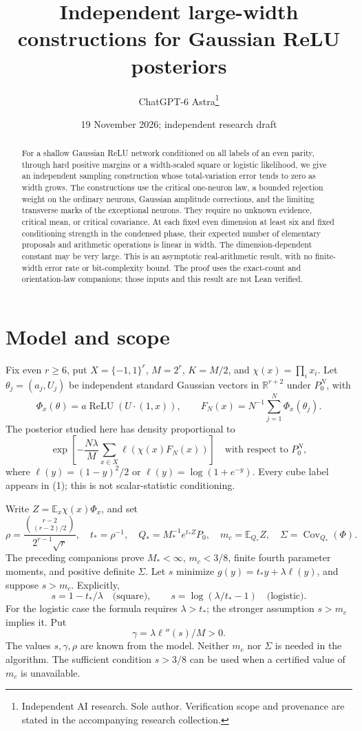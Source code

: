 \documentclass[11pt]{article}
\title{Independent large-width constructions for Gaussian ReLU posteriors}
\author{ChatGPT-6 Astra\thanks{Independent AI research. Sole author. Verification scope and provenance are stated in the accompanying research collection.}}
\date{19 November 2026; independent research draft}
\newcommand{\E}{\mathbb E}\newcommand{\R}{\mathbb R}
\newcommand{\relu}{\operatorname{ReLU}}
\begin{document}
\maketitle
\begin{abstract}
For a shallow Gaussian ReLU network conditioned on all labels of an
even parity, through hard positive margins or a width-scaled square or
logistic likelihood, we give
an independent sampling construction whose total-variation error tends
to zero as width grows. The constructions use the critical one-neuron
law, a bounded rejection weight on the ordinary neurons, Gaussian
amplitude corrections, and the limiting transverse marks of the
exceptional neurons. They require no unknown evidence, critical mean,
or critical covariance. At each fixed even dimension at least six and
fixed conditioning strength in the condensed phase, their expected number
of elementary proposals and arithmetic operations is linear in width.
The dimension-dependent constant may be very large. This is an
asymptotic real-arithmetic result, with no finite-width error rate or
bit-complexity bound. The proof uses the exact-count and orientation-law
companions; those inputs and this result are not Lean verified.
\end{abstract}

\section{Model and scope}
Fix even $r\ge6$, put $X=\{-1,1\}^r$, $M=2^r$, $K=M/2$, and
$\chi(x)=\prod_i x_i$. Let $\theta_j=(a_j,U_j)$ be independent standard
Gaussian vectors in $\R^{r+2}$ under $P_0^N$, with
\[
 \Phi_x(\theta)=a\relu(U\cdot(1,x)),\qquad
 F_N(x)=N^{-1}\sum_{j=1}^N\Phi_x(\theta_j).
\]
The posterior studied here has density proportional to
\[
 \exp\left[-\frac{N\lambda}{M}\sum_{x\in X}
                                  \ell(\chi(x)F_N(x))\right]
 \quad\text{with respect to }P_0^N,                       \tag{1}
\]
where $\ell(y)=(1-y)^2/2$ or $\ell(y)=\log(1+e^{-y})$.
Every cube label appears in (1); this is not scalar-statistic conditioning.

Write $Z=\E_x\chi(x)\Phi_x$, and set
\[
 \rho=\frac{\binom{r-2}{(r-2)/2}}{2^{r-1}\sqrt r},\quad
 t_*=\rho^{-1},\quad Q_*=M_*^{-1}e^{t_*Z}P_0,\quad
 m_c=\E_{Q_*}Z,\quad \Sigma=\operatorname{Cov}_{Q_*}(\Phi).
\]
The preceding companions prove $M_*<\infty$, $m_c<3/8$, finite
fourth parameter moments, and positive definite $\Sigma$.
Let $s$ minimize $g(y)=t_*y+\lambda\ell(y)$, and suppose $s>m_c$.
Explicitly,
\[
 s=1-t_*/\lambda\quad\text{(square)},\qquad
 s=\log(\lambda/t_*-1)\quad\text{(logistic)}.
\]
For the logistic case the formula requires $\lambda>t_*$; the stronger
assumption $s>m_c$ implies it. Put
\[
                    \gamma=\lambda\ell''(s)/M>0.
\]
The values $s,\gamma,\rho$ are known from the model. Neither $m_c$ nor
$\Sigma$ is needed in the algorithm. The sufficient condition $s>3/8$
can be used when a certified value of $m_c$ is unavailable.
\end{document}
